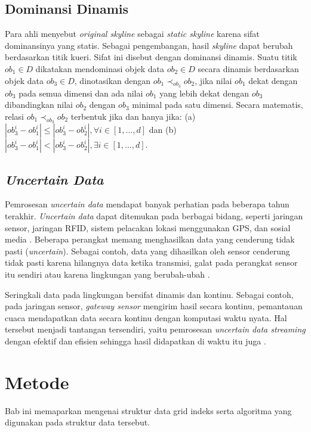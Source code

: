 \documentclass[conference]{IEEEtran}
\begin{document}
\subsection{Dominansi Dinamis}
Para ahli menyebut \textit{original skyline} sebagai \textit{static skyline} \cite{dynamic-skyline-2} karena sifat dominansinya yang statis. Sebagai pengembangan, hasil \textit{skyline} dapat berubah berdasarkan titik kueri. Sifat ini disebut dengan dominansi dinamis. Suatu titik $ob_1 \in D$ dikatakan mendominasi objek data $ob_2 \in D$ secara dinamis berdasarkan objek data $ob_3 \in D$, dinotasikan dengan $ob_1 \prec_{ob_3} ob_2$, jika nilai $ob_1$ dekat dengan $ob_3$ pada semua dimensi dan ada nilai $ob_1$ yang lebih dekat dengan $ob_3$ dibandingkan nilai $ob_2$ dengan $ob_3$ minimal pada satu dimensi. Secara matematis, relasi $ob_1 \prec_{ob_3} ob_2$ terbentuk jika dan hanya jika: (a) $|ob_3^i - ob_1^i| \leq |ob_3^i - ob_2^i|, \forall i \in [1, ..., d]$ dan (b) $|ob_3^i - ob_1^i| < |ob_3^i - ob_2^i|, \exists i \in [1, ..., d]$.

\subsection{\textit{Uncertain Data}}
Pemrosesan  \textit{uncertain data} mendapat banyak perhatian pada beberapa tahun terakhir. \textit{Uncertain data} dapat ditemukan pada berbagai bidang, seperti jaringan sensor, jaringan RFID, sistem pelacakan lokasi menggunakan GPS, dan sosial media \cite{surveyuncertaindata}. Beberapa perangkat memang menghasilkan data yang cenderung tidak pasti (\textit{uncertain}). Sebagai contoh, data yang dihasilkan oleh sensor cenderung tidak pasti karena hilangnya data ketika transmisi, galat pada perangkat sensor itu sendiri atau karena lingkungan yang berubah-ubah \cite{effectiveprob}.

Seringkali data pada lingkungan bersifat dinamis dan kontinu. Sebagai contoh, pada jaringan sensor, \textit{gateway sensor} mengirim hasil secara kontinu, pemantauan cuaca mendapatkan data secara kontinu dengan komputasi waktu nyata. Hal tersebut menjadi tantangan tersendiri, yaitu pemrosesan \textit{uncertain data streaming} dengan efektif dan efisien sehingga hasil didapatkan di waktu itu juga \cite{effectiveprob}.

\section{Metode}
Bab ini memaparkan mengenai struktur data grid indeks serta algoritma yang digunakan pada struktur data tersebut.
\end{document}
